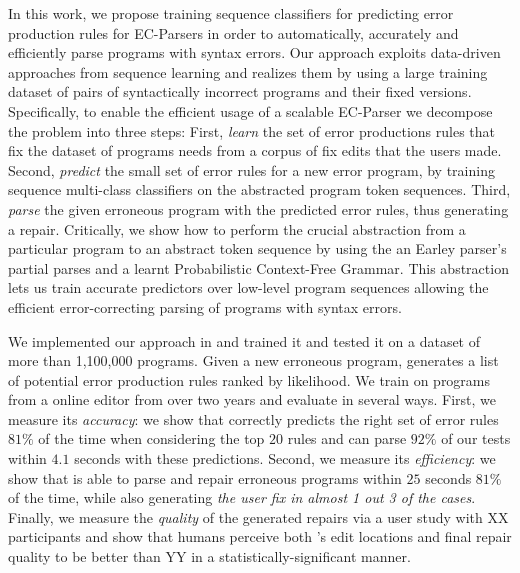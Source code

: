 In this work, we propose training sequence classifiers for predicting error
production rules for EC-Parsers in order to automatically, accurately and
efficiently parse programs with syntax errors. Our approach exploits data-driven
approaches from sequence learning and realizes them by using a large training
dataset of pairs of syntactically incorrect programs and their fixed versions.
%
Specifically, to enable the efficient usage of a scalable EC-Parser we decompose
the problem into three steps:
%
First, \emph{learn} the set of error productions rules that fix the dataset of
programs needs from a corpus of fix edits that the users made.
%
Second, \emph{predict} the small set of error rules for a new error program, by
training sequence multi-class classifiers on the abstracted program token
sequences.
%
Third, \emph{parse} the given erroneous program with the predicted error rules,
thus generating a repair.
%
Critically, we show how to perform the crucial abstraction from a particular
program to an abstract token sequence by using the an Earley parser's
\citep{Earley_1970} partial parses and a learnt Probabilistic Context-Free
Grammar. This abstraction lets us train accurate predictors over low-level
program sequences allowing the efficient error-correcting parsing of programs
with syntax errors.

\mypara{\toolname}
We implemented our approach in \toolname and trained it and tested it on a
dataset of more than 1,100,000 programs. Given a new erroneous program,
\toolname generates a list of potential error production rules ranked by
likelihood. We train \toolname on programs from a online editor from over two
years and evaluate in several ways.
%
First, we measure its \emph{accuracy}: we show that \toolname correctly predicts
the right set of error rules $81\%$ of the time when considering the top $20$
rules and can parse $92\%$ of our tests within $4.1$ seconds with these
predictions.
%
Second, we measure its \emph{efficiency}: we show that \toolname is able to
parse and repair erroneous programs within $25$ seconds $81\%$ of the time,
while also generating \emph{the user fix in almost 1 out 3 of the cases}.
%
Finally, we measure the \emph{quality} of the generated repairs via a user study
with XX participants and show that humans perceive both \toolname's edit
locations and final repair quality to be better than YY in a
statistically-significant manner.
